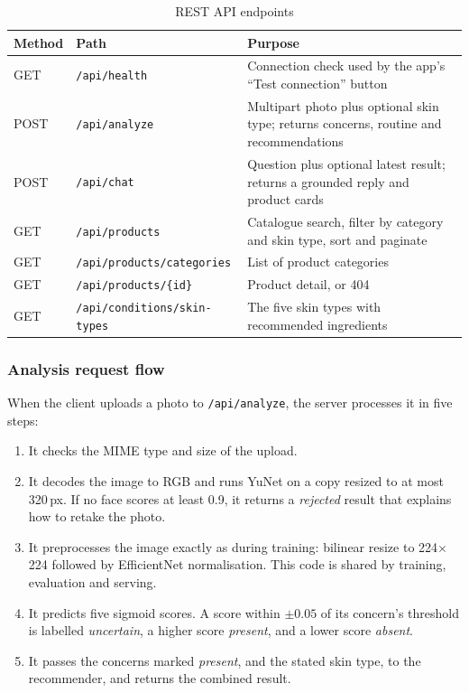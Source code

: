 \begin{table}[ht]
\centering\small
\caption{REST API endpoints}
\label{tab:api}
\begin{tabularx}{\linewidth}{lP{4.9cm}Y}
\toprule
\textbf{Method} & \textbf{Path} & \textbf{Purpose}\\
\midrule
GET & \texttt{/api/health} & Connection check used by the app's ``Test connection'' button\\
POST & \texttt{/api/analyze} & Multipart photo plus optional skin type; returns concerns, routine and recommendations\\
POST & \texttt{/api/chat} & Question plus optional latest result; returns a grounded reply and product cards\\
GET & \texttt{/api/products} & Catalogue search, filter by category and skin type, sort and paginate\\
GET & \texttt{/api/products/categories} & List of product categories\\
GET & \texttt{/api/products/\{id\}} & Product detail, or 404\\
GET & \texttt{/api/conditions/skin-types} & The five skin types with recommended ingredients\\
\bottomrule
\end{tabularx}
\end{table}

\subsubsection*{Analysis request flow}

When the client uploads a photo to \texttt{/api/analyze}, the server processes it in five steps:
\begin{enumerate}
  \item It checks the MIME type and size of the upload.
  \item It decodes the image to RGB and runs YuNet on a copy resized to at most 320\,px. If no face scores at least 0.9, it returns a \emph{rejected} result that explains how to retake the photo.
  \item It preprocesses the image exactly as during training: bilinear resize to 224$\times$224 followed by EfficientNet normalisation. This code is shared by training, evaluation and serving.
  \item It predicts five sigmoid scores. A score within $\pm0.05$ of its concern's threshold is labelled \emph{uncertain}, a higher score \emph{present}, and a lower score \emph{absent}.
  \item It passes the concerns marked \emph{present}, and the stated skin type, to the recommender, and returns the combined result.
\end{enumerate}

